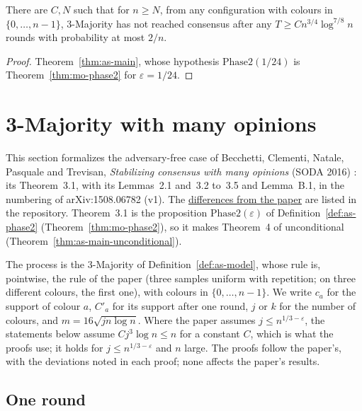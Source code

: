 \begin{theorem}[Theorem~4]\label{thm:as-main-unconditional}
\leanok
{}
There are $C,N$ such that for $n\ge N$, from any configuration with colours in
$\{0,\dots,n-1\}$, 3-Majority has not reached consensus after any $T\ge Cn^{3/4}\log^{7/8}n$
rounds with probability at most $2/n$.
\end{theorem}
\begin{proof}\leanok
Theorem~\ref{thm:as-main}, whose hypothesis $\mathrm{Phase2}(1/24)$ is
Theorem~\ref{thm:mo-phase2} for $\varepsilon=1/24$.
\end{proof}

\section{3-Majority with many opinions}\label{sec:bcnpt16-many-opinions}

This section formalizes the adversary-free case of Becchetti, Clementi, Natale, Pasquale and
Trevisan, \emph{Stabilizing consensus with many opinions} (SODA 2016) \cite{BCNPT16}: its
Theorem~3.1, with its Lemmas~2.1 and~3.2 to~3.5 and Lemma~B.1, in the numbering of
arXiv:1508.06782 (v1). The
\href{https://github.com/formal-dynamics/leanamics/blob/main/plurality/FORMALIZATION_DIFFERENCES.md#7-3-majority-with-many-opinions-manyopinions-roadmap-maj-12-a}{differences
from the paper} are listed in the repository. Theorem~3.1 is the proposition $\mathrm{Phase2}(\varepsilon)$ of
Definition~\ref{def:as-phase2} (Theorem~\ref{thm:mo-phase2}), so it makes Theorem~4 of
\cite{BCEKMN17} unconditional (Theorem~\ref{thm:as-main-unconditional}).

The process is the 3-Majority of Definition~\ref{def:as-model}, whose rule is, pointwise, the rule
of the paper (three samples uniform with repetition; on three different colours, the first one),
with colours in $\{0,\dots,n-1\}$. We write $c_a$ for the support of colour $a$, $C'_a$ for its
support after one round, $j$ or $k$ for the number of colours, and $m=16\sqrt{jn\log n}$. Where
the paper assumes $j\le n^{1/3-\varepsilon}$, the statements below assume $Cj^3\log n\le n$ for a
constant $C$, which is what the proofs use; it holds for $j\le n^{1/3-\varepsilon}$ and $n$
large. The proofs follow the paper's, with the deviations noted in each proof; none affects the
paper's results.

\subsection{One round}

